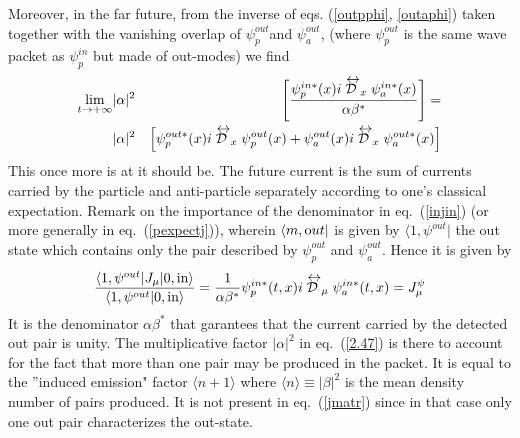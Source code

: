 \documentclass[12pt,oneside]{report}
\def\lrD{\mathrel{{\cal D}\kern-.75em\raise1.75ex\hbox{$\leftrightarrow$}}}
\begin{document}
Moreover, in the far future,
 from the inverse of eqs.  (\ref{outpphi}, \ref{outaphi}) taken together
with the vanishing overlap of $\psi^{out}_p$and $\psi^{out}_a$, 
(where $\psi^{out}_p$ is the same wave packet as  $\psi^{in}_p$ but made of
out-modes) 
we find
\begin{eqnarray}
\lim_{t\to +\infty} & |\alpha|^2 & \left [ \frac{\psi^{in *}_p(x)
i \lrD_{x} \psi^{in *}_a(x)}{\alpha
\beta^*} \right]
 = \nonumber \\
& |\alpha|^2 
& \left[ \psi^{out *}_p(x) i \lrD_{x} \psi^{out}_p(x)
 + \psi^{out}_a(x) i \lrD_{x} \psi^{out *}_a(x) 
\right]
\label{2.47}
\end{eqnarray}
This once more is at it should be.  The future current is the sum of currents
carried by the particle and anti-particle separately according to one's
classical expectation.  Remark on the importance of the
denominator in eq.~(\ref{injin})  (or more generally in eq.~(\ref{pexpectj})),
wherein $\langle m, {\mbox out}\vert$  is given by
$\langle 1, \psi^{out} \vert$ the out state which contains only the
pair described by $\psi^{out}_p$ and $\psi^{out}_a$. Hence it is given by
\begin{equation}
\frac{\langle 1, \psi^{out} \vert J_{\mu} \vert 0, {\mbox{in}} \rangle}
{\langle 1, \psi^{out} \vert0, {\mbox{in}} \rangle} =
\frac {1}{\alpha \beta^*} \psi_p^{in *}(t,x) i \lrD_{\mu} \psi_a^{in *}(t,x)
= J_{\mu}^{\psi}
\label{jmatr}
\end{equation}
It is the denominator $\alpha
\beta^*$ that garantees that the current carried by the detected out pair is 
unity. 
The multiplicative factor $|\alpha|^2$ in eq.~(\ref{2.47}) is there
to account for the
fact that more than one pair may be produced in the packet. It is equal to
the ''induced emission"
factor  $\langle n+1\rangle$ where  $\langle n\rangle \equiv |\beta|^2$ is
the mean density number of pairs
produced. It is not present in eq.~(\ref{jmatr}) since in that case only
one out pair characterizes the out-state.
\end{document}
